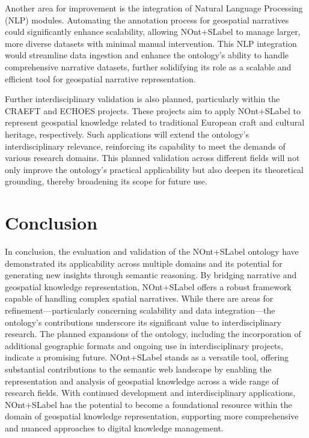 Another area for improvement is the integration of Natural Language Processing (NLP) modules. Automating the annotation process for geospatial narratives could significantly enhance scalability, allowing \acrshort{NOnt+SLabel} to manage larger, more diverse datasets with minimal manual intervention. This NLP integration would streamline data ingestion and enhance the ontology’s ability to handle comprehensive narrative datasets, further solidifying its role as a scalable and efficient tool for geospatial narrative representation.

Further interdisciplinary validation is also planned, particularly within the CRAEFT \cite{CraeftCareJudgment} and ECHOES \cite{EchoesEccchEuropean} projects. These projects aim to apply \acrshort{NOnt+SLabel} to represent geospatial knowledge related to traditional European craft and cultural heritage, respectively. Such applications will extend the ontology’s interdisciplinary relevance, reinforcing its capability to meet the demands of various research domains. This planned validation across different fields will not only improve the ontology’s practical applicability but also deepen its theoretical grounding, thereby broadening its scope for future use.

\section{Conclusion}

In conclusion, the evaluation and validation of the \acrshort{NOnt+SLabel} ontology have demonstrated its applicability across multiple domains and its potential for generating new insights through semantic reasoning. By bridging narrative and geospatial knowledge representation, \acrshort{NOnt+SLabel} offers a robust framework capable of handling complex spatial narratives. While there are areas for refinement—particularly concerning scalability and data integration—the ontology’s contributions underscore its significant value to interdisciplinary research. The planned expansions of the ontology, including the incorporation of additional geographic formats and ongoing use in interdisciplinary projects, indicate a promising future. \acrshort{NOnt+SLabel} stands as a versatile tool, offering substantial contributions to the semantic web landscape by enabling the representation and analysis of geospatial knowledge across a wide range of research fields. With continued development and interdisciplinary applications, \acrshort{NOnt+SLabel} has the potential to become a foundational resource within the domain of geospatial knowledge representation, supporting more comprehensive and nuanced approaches to digital knowledge management.
